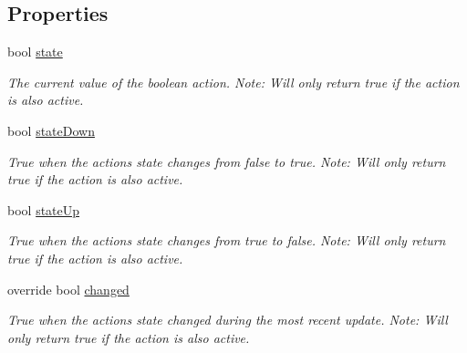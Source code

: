 \subsection*{Properties}
\begin{DoxyCompactItemize}
\item 
bool \mbox{\hyperlink{class_valve_1_1_v_r_1_1_steam_v_r___action___boolean___source_a63563619aa24bc698e0291a332ee68ae}{state}}
\begin{DoxyCompactList}\small\item\em The current value of the boolean action. Note\+: Will only return true if the action is also active. \end{DoxyCompactList}\item 
bool \mbox{\hyperlink{class_valve_1_1_v_r_1_1_steam_v_r___action___boolean___source_aee3c0e3480c1837b3455229733a2d58c}{state\+Down}}
\begin{DoxyCompactList}\small\item\em True when the action\textquotesingle{}s state changes from false to true. Note\+: Will only return true if the action is also active. \end{DoxyCompactList}\item 
bool \mbox{\hyperlink{class_valve_1_1_v_r_1_1_steam_v_r___action___boolean___source_a1fc319a221f4ca4f89c35b0836bd6d81}{state\+Up}}
\begin{DoxyCompactList}\small\item\em True when the action\textquotesingle{}s state changes from true to false. Note\+: Will only return true if the action is also active. \end{DoxyCompactList}\item 
override bool \mbox{\hyperlink{class_valve_1_1_v_r_1_1_steam_v_r___action___boolean___source_a2dce0c19bb9d547f63dc1d8432df2c95}{changed}}
\begin{DoxyCompactList}\small\item\em True when the action\textquotesingle{}s state changed during the most recent update. Note\+: Will only return true if the action is also active. \end{DoxyCompactList}\item 

\end{DoxyCompactItemize}
